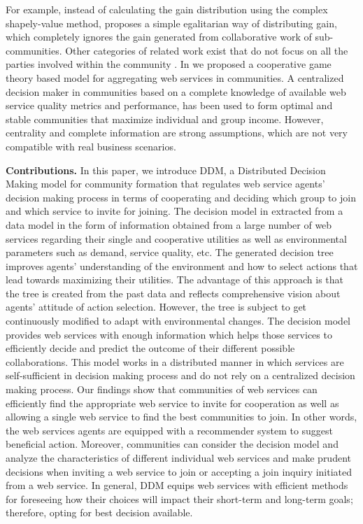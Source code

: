 \documentclass[10pt,journal,cspaper,compsoc]{IEEEtran}
\begin{document}
For example, instead of calculating the gain distribution using the complex shapely-value method, \cite{10.1109/TSC.2012.12} proposes a simple egalitarian way of distributing gain, which completely ignores the gain generated from collaborative work of sub-communities. Other categories of related work exist that do not focus on all the parties involved within the community \cite{DBLP:conf/IEEEscc/KhosravifarABT11}. 
In \cite{journal-community-formation} we proposed a cooperative game theory based model for aggregating web services in communities. A centralized decision maker in communities based on a complete knowledge of available web service quality metrics and performance, has been used to form optimal and stable communities that maximize individual and group income. However, centrality and complete information are strong assumptions, which are not very compatible with real business scenarios.

\textbf{Contributions.} In this paper, we introduce DDM, a Distributed Decision Making model for  community formation that regulates web service agents’ decision making process in terms of cooperating and deciding which group to join and which service to invite for joining. The decision model in extracted from a data model in the form of information obtained from a large number of web services regarding their single and cooperative utilities as well as environmental parameters such as demand, service quality, etc. The generated decision tree improves agents' understanding of the environment and how to select actions that lead towards maximizing their utilities. The advantage of this approach is that the tree is created from the past data and reflects comprehensive vision about agents' attitude of action selection. However, the tree is subject to get continuously modified to adapt with environmental changes.
The decision model provides web services with enough information which helps those services to efficiently decide and predict the outcome of their different possible collaborations. This model works in a distributed manner in which services are self-sufficient in decision making process and do not rely on a centralized decision making process. Our findings show that communities of web services can efficiently find the appropriate web service to invite for cooperation as well as allowing a single web service to find the best communities to join. In other words, the web services agents are equipped with a recommender system to suggest beneficial action. Moreover, communities can consider the decision model and analyze the characteristics of different individual web services and make prudent decisions when inviting a web service to join or accepting a join inquiry initiated from a web service. In general, DDM equips web services with efficient methods for foreseeing how their choices will impact their short-term and long-term goals; therefore, opting for best decision available.
\end{document}
